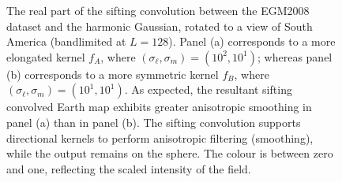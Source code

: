 \begin{figure}[htpb]
	\centering\capstart{}
	\hfill
	\caption[
		Two harmonic Gaussians convolved with a map of the Earth
	]{
		The real part of the sifting convolution between the EGM2008 dataset and the harmonic Gaussian, rotated to a view of South America (bandlimited at \(L=128\)).
		Panel (a) corresponds to a more elongated kernel \(f_{A}\), where \((\sigma_{\ell},\sigma_{m}) = (10^{2}, 10^{1})\); whereas panel (b) corresponds to a more symmetric kernel \(f_{B}\), where \((\sigma_{\ell},\sigma_{m}) = (10^{1}, 10^{1})\).
		As expected, the resultant sifting convolved Earth map exhibits greater anisotropic smoothing in panel (a) than in panel (b).
		The sifting convolution supports directional kernels to perform anisotropic filtering (smoothing), while the output remains on the sphere.
		The colour is between zero and one, reflecting the scaled intensity of the field.
	}\label{fig:chapter3_convolved}
\end{figure}
